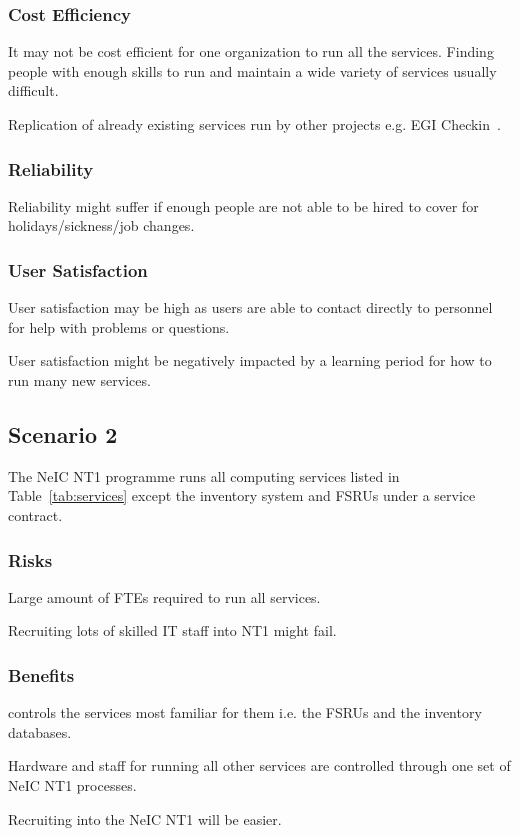 \documentclass[12pt,a4paper]{article}
\newcommand{\nnt}{NeIC NT1\xspace}
\begin{document}
\subsubsection*{Cost Efficiency}
\bitm
\item It may not be cost efficient for one organization to run all the services. Finding people with enough skills to run and maintain a wide variety of services usually difficult.
\item Replication of already existing services run by other \einfra projects e.g. EGI Checkin~\cite{egi-checkin}.
\eitm

\subsubsection*{Reliability}
\bitm
\item Reliability might suffer if enough people are not able to be hired to cover for holidays/sickness/job changes.
\eitm

\subsubsection*{User Satisfaction}
\bitm
\item User satisfaction may be high as users are able to contact directly to \EC personnel for help with problems or questions.
\item User satisfaction might be negatively impacted by a learning period for how to run many new services.
\eitm


\subsection{Scenario 2}
\label{ssec:scen2}

The \nnt programme runs all computing services listed in Table~\ref{tab:services} except the \ED inventory system and FSRUs under a service contract.

\subsubsection*{Risks}
\bitm
\item Large amount of FTEs required to run all services.
\item Recruiting lots of skilled IT staff into NT1 might fail.
\eitm

\subsubsection*{Benefits}
\bitm
\item \EC controls the services most familiar for them i.e. the FSRUs and the inventory databases.
\item Hardware and staff for running all other services are controlled through one set of \nnt processes.
\item Recruiting into the \nnt will be easier.
\eitm
\end{document}
